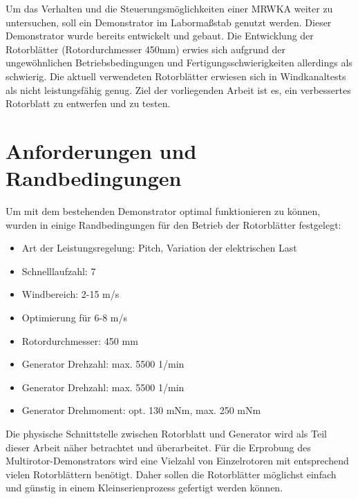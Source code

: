 Um das Verhalten und die Steuerungsmöglichkeiten einer MRWKA weiter zu untersuchen, soll ein Demonstrator im Labormaßstab genutzt werden. Dieser Demonstrator wurde bereits entwickelt und gebaut. Die Entwicklung der Rotorblätter (Rotordurchmesser 450mm) erwies sich aufgrund der ungewöhnlichen Betriebsbedingungen und Fertigungsschwierigkeiten allerdings als schwierig. Die aktuell verwendeten Rotorblätter erwiesen sich in Windkanaltests als nicht leistungsfähig genug. Ziel der vorliegenden Arbeit ist es, ein verbessertes Rotorblatt zu entwerfen und zu testen.
\section{Anforderungen und Randbedingungen}
Um mit dem bestehenden Demonstrator optimal funktionieren zu können, wurden in \cite{buchholz_erarbeitung_2020} einige Randbedingungen für den Betrieb der Rotorblätter festgelegt:
\begin{itemize}
    \item Art der Leistungsregelung: Pitch, Variation der elektrischen Last
    \item Schnelllaufzahl: 7
    \item Windbereich: 2-15 m/s
    \item Optimierung für 6-8 m/s
    \item Rotordurchmesser: 450 mm
    \item Generator Drehzahl: max. 5500 1/min
    \item Generator Drehzahl: max. 5500 1/min
    \item Generator Drehmoment: opt. 130 mNm, max. 250 mNm
\end{itemize}

Die physische Schnittstelle zwischen Rotorblatt und Generator wird als Teil dieser Arbeit näher betrachtet und überarbeitet. Für die Erprobung des Multirotor-Demonstrators wird eine Vielzahl von Einzelrotoren mit entsprechend vielen Rotorblättern benötigt. Daher sollen die Rotorblätter möglichst einfach und günstig in einem Kleinserienprozess gefertigt werden können.

